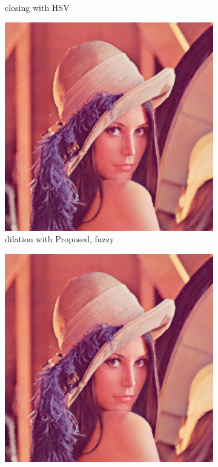 \begin{figure}[!ht]
\begin{subfigure}[t]{0.22\textwidth}
    \caption{closing with HSV}
    \centering
  \end{subfigure}
\begin{subfigure}[t]{0.22\textwidth}
    \includegraphics[width=0.9\linewidth]{../project/images/outputs/compare_order/dilation_Proposed_fuzzy.png}
    \caption{dilation with Proposed, fuzzy}
    \centering
  \end{subfigure}
\begin{subfigure}[t]{0.22\textwidth}
    \includegraphics[width=0.9\linewidth]{../project/images/outputs/compare_order/erosion_Proposed_fuzzy.png}

\end{subfigure}
\end{figure}
